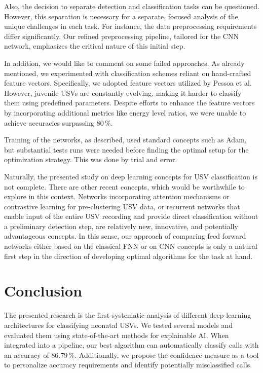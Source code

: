 \documentclass[preprint,NumberedRefs]{JASA}
\begin{document}
Also, the decision to separate detection and classification tasks can be questioned. However, this separation is necessary for a separate, focused analysis of the unique challenges in each task. For instance, the data preprocessing requirements differ significantly. Our refined preprocessing pipeline, tailored for the CNN network, emphasizes the critical nature of this initial step. 

In addition, we would like to comment on some failed approaches. As already mentioned, we experimented with classification schemes reliant on hand-crafted feature vectors. Specifically, we adopted feature vectors utilized by Pessoa et al. \cite{Pessoa2022-sy} However, juvenile USVs are constantly evolving, making it harder to classify them using predefined parameters. Despite efforts to enhance the feature vectors by incorporating additional metrics like energy level ratios, we were unable to achieve accuracies surpassing \(80\,\mathrm{\%} \).

Training of the networks, as described, used standard concepts such as Adam, but substantial tests runs were needed before finding the optimal setup for the optimization strategy. This was done by trial and error.

Naturally, the presented study on deep learning concepts for USV classification is not complete. There are other recent concepts, which would be worthwhile to explore in this context. Networks incorporating attention mechanisms or contrastive learning for pre-clustering USV data, or recurrent networks that enable input of the entire USV recording and provide direct classification without a preliminary detection step, are relatively new, innovative, and potentially advantageous concepts. In this sense, our approach of comparing feed forward networks either based on the classical FNN or on CNN concepts is only a natural first step in the direction of developing optimal algorithms for the task at hand.

\section{Conclusion}
\label{sec:Conclusion}

The presented research is the first systematic analysis of different deep learning architectures for classifying neonatal USVs. We tested several models and evaluated them using state-of-the-art methods for explainable AI. When integrated into a pipeline, our best algorithm can automatically classify calls with an accuracy of \(86.79\,\mathrm{\%}\). Additionally, we propose the confidence measure as a tool to personalize accuracy requirements and identify potentially misclassified calls.
\end{document}
